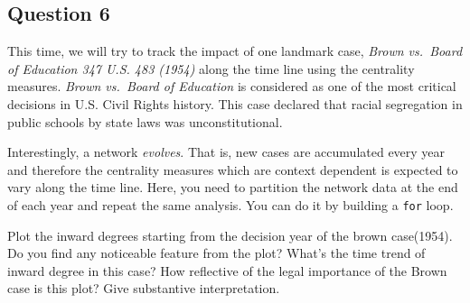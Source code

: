 \documentclass[]{article}
\begin{document}
\subsection{Question 6}\label{question-6}

This time, we will try to track the impact of one landmark case,
\emph{Brown vs.~Board of Education 347 U.S. 483 (1954)} along the time
line using the centrality measures. \emph{Brown vs.~Board of Education}
is considered as one of the most critical decisions in U.S. Civil Rights
history. This case declared that racial segregation in public schools by
state laws was unconstitutional.

Interestingly, a network \emph{evolves}. That is, new cases are
accumulated every year and therefore the centrality measures which are
context dependent is expected to vary along the time line. Here, you
need to partition the network data at the end of each year and repeat
the same analysis. You can do it by building a \texttt{for} loop.

Plot the inward degrees starting from the decision year of the brown
case(1954). Do you find any noticeable feature from the plot? What's the
time trend of inward degree in this case? How reflective of the legal
importance of the Brown case is this plot? Give substantive
interpretation.
\end{document}
